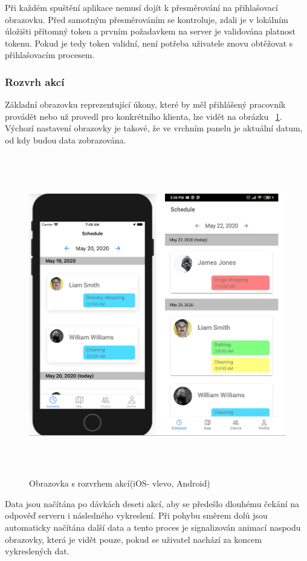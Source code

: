 \documentclass[
  glossaries,
]{kidiplom}
\begin{document}
Při každém spuštění aplikace nemusí dojít k přesměrování na přihlašovací obrazovku. Před samotným přesměrováním se kontroluje, zdali je v lokálním úložišti přítomný token a prvním požadavkem na server je validována platnost tokenu. Pokud je tedy token validní, není potřeba uživatele znovu obtěžovat s přihlašovacím procesem.

\subsubsection{Rozvrh akcí}
\label{sec:schedule}
Základní obrazovku reprezentující úkony, které by měl přihlášený pracovník provádět nebo už provedl pro konkrétního klienta, lze vidět na obrázku ~\ref{fig:schedule_screen}. Výchozí nastavení obrazovky je takové, že ve vrchním panelu je aktuální datum, od kdy budou data zobrazována. 

\begin{figure}[H]
  	\centering
 	 \includegraphics[width=14cm,height=14cm,keepaspectratio]{schedule_screen}
 	 \caption{Obrazovka s rozvrhem akcí(iOS- vlevo, Android)}
 	 \label{fig:schedule_screen}
\end{figure}

Data jsou načítána po dávkách deseti akcí, aby se předešlo dlouhému čekání na odpověď serveru i následného vykreslení. Při pohybu směrem dolů jsou automaticky načítána další data a tento proces je signalizován animací naspodu obrazovky, která je vidět pouze, pokud se uživatel nachází za koncem vykreslených dat.
\end{document}
